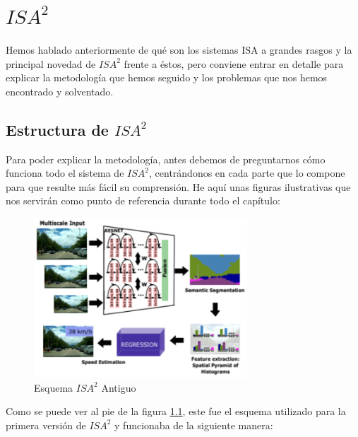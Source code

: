 \chapter{$ISA^{2}$}

Hemos hablado anteriormente de qué son los sistemas \ac{ISA} a grandes rasgos y la principal novedad de $ISA^{2}$ frente a éstos, pero conviene entrar en detalle para explicar la metodología que hemos seguido y los problemas que nos hemos encontrado y solventado.

\section{Estructura de $ISA^{2}$}

Para poder explicar la metodología, antes debemos de preguntarnos cómo funciona todo el sistema de $ISA^{2}$, centrándonos en cada parte que lo compone para que resulte más fácil su comprensión. He aquí unas figuras ilustrativas que nos servirán como punto de referencia durante todo el capítulo:


\begin{figure}[H]
  \centering
  \includegraphics[width=8cm]{Figuras/Figura_Esquema_ISA2_Version_1_SegSem.eps}
  \caption{Esquema $ISA^{2}$ Antiguo}
  \label{fig:Isa_v1}
\end{figure}


Como se puede ver al pie de la figura \ref{fig:Isa_v1}, este fue el esquema utilizado para la primera versión de $ISA^{2}$ \cite{isa2} y funcionaba de la siguiente manera:


